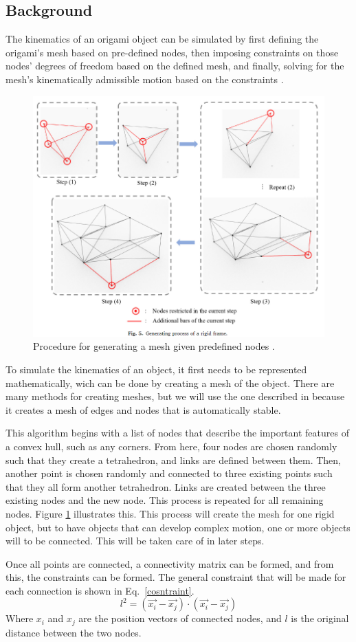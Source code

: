 \documentclass[letterpaper]{article}
\begin{document}
\subsection*{Background}
The kinematics of an origami object can be simulated by first defining the origami's mesh based on pre-defined nodes, then imposing constraints on those nodes' degrees of freedom based on the defined mesh, and finally, solving for the mesh's kinematically admissible motion based on the constraints \cite{zhu2022review}. 
%
\begin{figure}
    \centering
    \includegraphics[width=0.47\columnwidth]{mesh_gen.png}
    \caption{Procedure for generating a mesh given predefined nodes \cite{zhang2021folding}.}
    \label{fig:mesh_gen}
\end{figure}
%
To simulate the kinematics of an object, it first needs to be represented mathematically, wich can be done by creating a mesh of the object. There are many methods for creating meshes, but we will use the one described in \cite{zhang2021folding} because it creates a mesh of edges and nodes that is automatically stable.

This algorithm begins with a list of nodes that describe the important features of a convex hull, such as any corners. From here, four nodes are chosen randomly such that they create a tetrahedron, and links are defined between them. Then, another point is chosen randomly and connected to three existing points such that they all form another tetrahedron. Links are created between the three existing nodes and the new node. This process is repeated for all remaining nodes. Figure \ref{fig:mesh_gen} illustrates this. This process will create the mesh for one rigid object, but to have objects that can develop complex motion, one or more objects will to be connected. This will be taken care of in later steps.

Once all points are connected, a connectivity matrix can be formed, and from this, the constraints can be formed. The general constraint that will be made for each connection is shown in Eq.~\ref{cosntraint}.
\begin{equation}
    l^2=(\Vec{x_i}-\Vec{x_j})\cdot (\Vec{x_i}-\Vec{x_j}) 
    \label{cosntraint}
\end{equation}
Where $x_i$ and $x_j$ are the position vectors of connected nodes, and $l$ is the original distance between the two nodes. 
\end{document}
